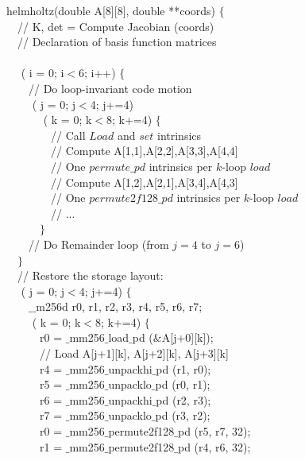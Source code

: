 \documentclass[conference]{IEEEtran}
\begin{document}
\begin{algorithm}[t]
\small
{} helmholtz(double A[8][8], double **coords) $\lbrace$\\
~~// K, det = Compute Jacobian (coords) \\
~~// Declaration of basis function matrices \\
~~\\
~~ ( i = 0; i$<$6; i++) $\lbrace$ \\
~~~~// Do loop-invariant code motion \\
~~~~ ( j = 0; j$<$4; j+=4) \\
~~~~~~ ( k = 0; k$<$8; k+=4) $\lbrace$\\
~~~~~~~~// Call $Load$ and $set$ intrinsics \\
~~~~~~~~// Compute A[1,1],A[2,2],A[3,3],A[4,4] \\
~~~~~~~~// One $permute\_pd$ intrinsics per $k$-loop $load$\\
~~~~~~~~// Compute A[1,2],A[2,1],A[3,4],A[4,3] \\
~~~~~~~~// One $permute2f128\_pd$ intrinsics per $k$-loop $load$\\
~~~~~~~~// ...\\
~~~~~~$\rbrace$\\
~~~~// Do Remainder loop (from $j=4$ to $j=6$)\\
~~$\rbrace$\\
~~// Restore the storage layout:\\
~~ ( j = 0; j$<$4; j+=4) $\lbrace$\\
~~~~$\_\_$m256d r0, r1, r2, r3, r4, r5, r6, r7;\\
~~~~ ( k = 0; k$<$8; k+=4) $\lbrace$\\
~~~~~~r0 = $\_$mm256$\_$load$\_$pd ($\&$A[j+0][k]);\\
~~~~~~// Load A[j+1][k], A[j+2][k], A[j+3][k]\\
~~~~~~r4 = $\_$mm256$\_$unpackhi$\_$pd (r1, r0);\\
~~~~~~r5 = $\_$mm256$\_$unpacklo$\_$pd (r0, r1);\\
~~~~~~r6 = $\_$mm256$\_$unpackhi$\_$pd (r2, r3);\\
~~~~~~r7 = $\_$mm256$\_$unpacklo$\_$pd (r3, r2);\\
~~~~~~r0 = $\_$mm256$\_$permute2f128$\_$pd (r5, r7, 32);\\
~~~~~~r1 = $\_$mm256$\_$permute2f128$\_$pd (r4, r6, 32);\\

\end{algorithm}
\end{document}
